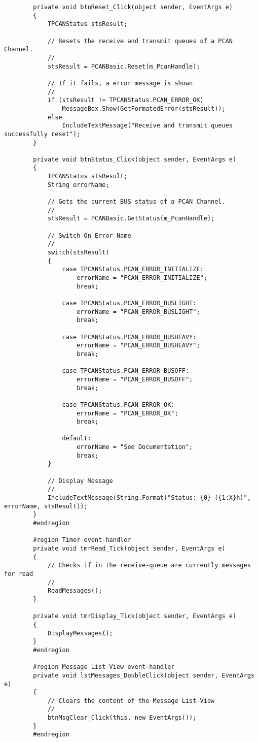 \begin{lstlisting}
        private void btnReset_Click(object sender, EventArgs e)
        {
		    TPCANStatus stsResult;

		    // Resets the receive and transmit queues of a PCAN Channel.
		    //
		    stsResult = PCANBasic.Reset(m_PcanHandle);

		    // If it fails, a error message is shown
		    //
		    if (stsResult != TPCANStatus.PCAN_ERROR_OK)
			    MessageBox.Show(GetFormatedError(stsResult));
		    else
			    IncludeTextMessage("Receive and transmit queues successfully reset");
        }

        private void btnStatus_Click(object sender, EventArgs e)
        {
	        TPCANStatus stsResult;
	        String errorName;

	        // Gets the current BUS status of a PCAN Channel.
	        //
	        stsResult = PCANBasic.GetStatus(m_PcanHandle);

	        // Switch On Error Name
	        //
	        switch(stsResult)
	        {
		        case TPCANStatus.PCAN_ERROR_INITIALIZE:
			        errorName = "PCAN_ERROR_INITIALIZE";
			        break;

		        case TPCANStatus.PCAN_ERROR_BUSLIGHT:
			        errorName = "PCAN_ERROR_BUSLIGHT";
			        break;

		        case TPCANStatus.PCAN_ERROR_BUSHEAVY:
			        errorName = "PCAN_ERROR_BUSHEAVY";
			        break;

		        case TPCANStatus.PCAN_ERROR_BUSOFF:
			        errorName = "PCAN_ERROR_BUSOFF";
			        break;

		        case TPCANStatus.PCAN_ERROR_OK:
			        errorName = "PCAN_ERROR_OK";
			        break;

		        default:
			        errorName = "See Documentation";
			        break;
	        }

	        // Display Message
	        //
	        IncludeTextMessage(String.Format("Status: {0} ({1:X}h)", errorName, stsResult));
        }
        #endregion

        #region Timer event-handler
        private void tmrRead_Tick(object sender, EventArgs e)
        {
            // Checks if in the receive-queue are currently messages for read
            //
            ReadMessages();
        }

        private void tmrDisplay_Tick(object sender, EventArgs e)
        {
            DisplayMessages();
        }
        #endregion

        #region Message List-View event-handler
        private void lstMessages_DoubleClick(object sender, EventArgs e)
        {
            // Clears the content of the Message List-View
            //
            btnMsgClear_Click(this, new EventArgs());
        }
        #endregion


\end{lstlisting}
